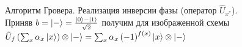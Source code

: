 \begin{figure}
\centering



\caption{Алгоритм Гровера. Реализация инверсии фазы (оператор
  $\hat{U}_{x^\ast}$). Приняв 
  $b=\ket{-} = \frac{\ket{0} -
    \ket{1}}{\sqrt{2}}$ получим для изображенной схемы
$\hat{U}_{f}\left(\sum_x \alpha_x \ket{x}\right)\otimes\ket{-} = 
\sum_x \alpha_x
\left(-1\right)^{f\left(x\right)}\ket{x}\otimes\ket{-}$} 
\label{figQuantCompGroverPhaseInvImpl}
\end{figure}
